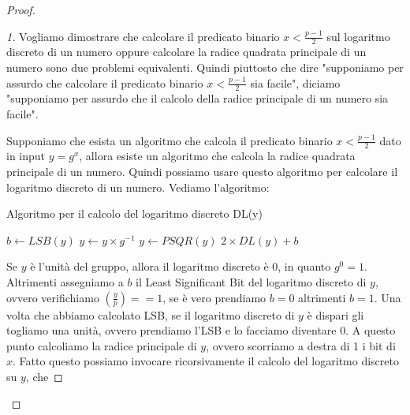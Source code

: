 \begin{proof}
\begin{proof}[1]
Vogliamo dimostrare che calcolare il predicato binario $x < \frac{p-1}{2}$ sul logaritmo discreto di un numero oppure calcolare la radice quadrata principale di un numero sono due problemi equivalenti. Quindi piuttosto che dire "supponiamo per assurdo che calcolare il predicato binario $x < \frac{p-1}{2}$ sia facile", diciamo "supponiamo per assurdo che il calcolo della radice principale di un numero sia facile".

Supponiamo che esista un algoritmo che calcola il predicato binario  $x < \frac{p-1}{2}$ dato in input $y = g^x$, allora esiste un algoritmo che calcola la radice quadrata principale di un numero. Quindi possiamo usare questo algoritmo per calcolare il logaritmo discreto di un numero. 
Vediamo l'algoritmo:
\begin{algorithm}[H]
\caption{Algoritmo per il calcolo del logaritmo discreto DL(y)}\label{alg:cap}
\begin{algorithmic}
    \State {}   
\Else
    \State $b \gets LSB(y)$
        \State $y \gets y \times g^{-1}$     
    \EndIf
    \State $y \gets PSQR(y)$    
    \State \Return $2 \times DL(y) + b$
\EndIf
\end{algorithmic}
\end{algorithm}

\noindent Se $y$ è l'unità del gruppo, allora il logaritmo discreto è $0$, in quanto $g^0=1$. Altrimenti assegniamo a $b$ il Least Significant Bit del logaritmo discreto di $y$, ovvero verifichiamo $\left( \frac{y}{p}\right) == 1$, se è vero prendiamo $b=0$ altrimenti $b=1$. Una volta che abbiamo calcolato LSB, se il logaritmo discreto di $y$ è dispari gli togliamo una unità, ovvero prendiamo l'LSB e lo facciamo diventare $0$. A questo punto calcoliamo la radice principale di $y$, ovvero scorriamo a destra di 1 i bit di $x$. Fatto questo possiamo invocare ricorsivamente il calcolo del logaritmo discreto su $y$, che 
\end{proof}
    

\end{proof}
